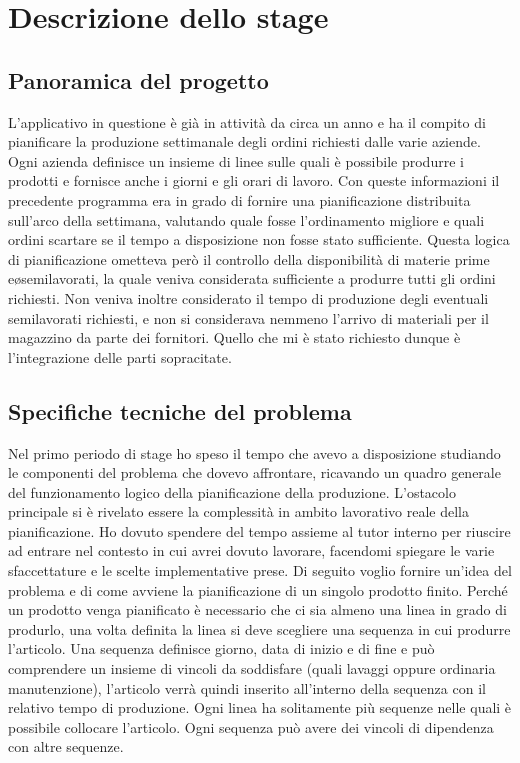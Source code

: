 
\chapter{Descrizione dello stage}
\label{cap:Descrizione-dello-stage}

\section{Panoramica del progetto}
L'applicativo in questione è già in attività da circa un anno e ha il compito di pianificare la produzione settimanale degli ordini richiesti dalle varie aziende. Ogni azienda definisce un insieme di linee sulle quali è possibile produrre i prodotti e fornisce anche i giorni e gli orari di lavoro.
Con queste informazioni il precedente programma era in grado di fornire una pianificazione distribuita sull'arco della settimana, valutando quale fosse l'ordinamento migliore e quali ordini scartare se il tempo a disposizione non fosse stato sufficiente. Questa logica di pianificazione ometteva però il controllo della disponibilità di materie prime e\o semilavorati, la quale veniva considerata sufficiente a produrre tutti gli ordini richiesti. Non veniva inoltre considerato il tempo di produzione degli eventuali semilavorati richiesti, e non si considerava nemmeno l'arrivo di materiali per il magazzino da parte dei fornitori.
Quello che mi è stato richiesto dunque è l'integrazione delle parti sopracitate.

\section{Specifiche tecniche del problema}

Nel primo periodo di stage ho speso il tempo che avevo a disposizione studiando le componenti del problema che dovevo affrontare, ricavando un quadro generale del funzionamento logico della pianificazione della produzione. L'ostacolo principale si è rivelato essere la complessità in ambito lavorativo reale della pianificazione. Ho dovuto spendere del tempo assieme al tutor interno per riuscire ad entrare nel contesto in cui avrei dovuto lavorare, facendomi spiegare le varie sfaccettature e le scelte implementative prese. Di seguito voglio fornire un'idea del problema e di come avviene la pianificazione di un singolo prodotto finito.
Perché un prodotto venga pianificato è necessario che ci sia almeno una linea in grado di produrlo, una volta definita la linea si deve scegliere una sequenza in cui produrre l'articolo. Una sequenza definisce giorno, data di inizio e di fine e può comprendere un insieme di vincoli da soddisfare (quali lavaggi oppure ordinaria manutenzione), l'articolo verrà quindi inserito all'interno della sequenza con il relativo tempo di produzione. Ogni linea ha solitamente più sequenze nelle quali è possibile collocare l'articolo. Ogni sequenza può avere dei vincoli di dipendenza con altre sequenze.


